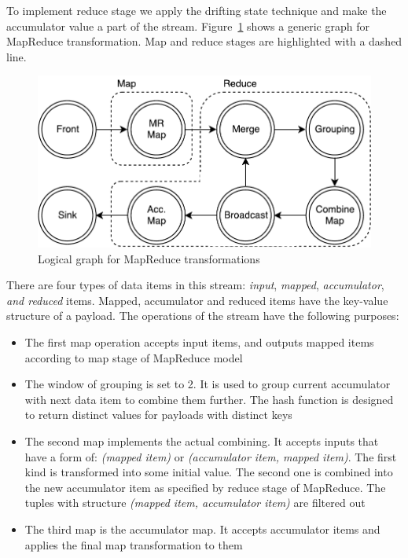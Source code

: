 To implement reduce stage we apply the drifting state technique and make the accumulator value a part of the stream. Figure~\ref{mapreduce-graph-figure} shows a generic graph for MapReduce transformation. Map and reduce stages are highlighted with a dashed line. 

\begin{figure}[htb]
  \centering
  \includegraphics[scale=0.5]{pics/mapreduce}
  \caption{Logical graph for MapReduce transformations}
  \label {mapreduce-graph-figure}
\end{figure}

There are four types of data items in this stream: {\it input}, {\it mapped}, {\it accumulator}, {\it and reduced} items. Mapped, accumulator and reduced items have the key-value structure of a payload. The operations of the stream have the following purposes:

\begin{itemize}
  \item The first map operation accepts input items, and outputs mapped items according to map stage of MapReduce model
  \item The window of grouping is set to 2. It is used to group current accumulator with next data item to combine them further. The hash function is designed to return distinct values for payloads with distinct keys
  \item The second map implements the actual combining. It accepts inputs that have a form of: \textit{(mapped item)} or \textit{(accumulator item, mapped item)}. The first kind is transformed into some initial value. The second one is combined into the new accumulator item as specified by reduce stage of MapReduce. The tuples with structure \textit{(mapped item, accumulator item)} are filtered out
  \item The third map is the accumulator map. It accepts accumulator items and applies the final map transformation to them
\end{itemize}

